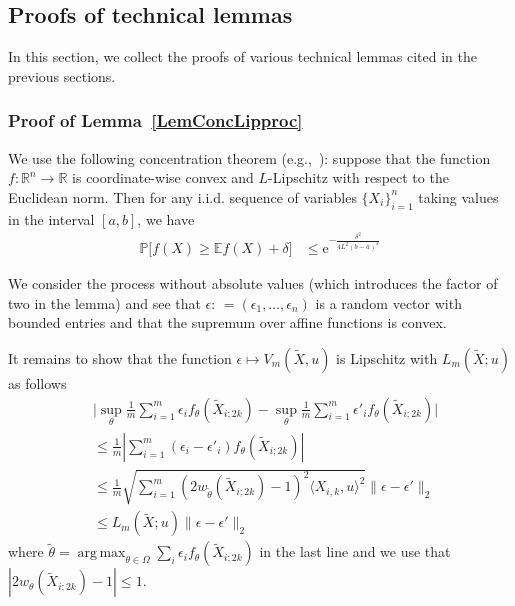 \documentclass[twoside,11pt]{article}
\newcommand{\numobs}{\ensuremath{n}}
\DeclareMathOperator*{\argmax}{arg\, max}
\def\RN{ \mathbb{R} }						%
\def\EE{ \mathbb{E} }
\def\E{ \mathrm{e} }							%
\newcommand{\norm}[1]{\ensuremath{\|#1\|_2}}
\newcommand{\weightsingle}[2]{w_{#1}(#2)}
\newcommand{\paramjoint}{\theta}
\newcommand{\paramspacejoint}{\DomTheta}
\newcommand{\mprob}{\ensuremath{\mathbb{P}}}
\newcommand{\defn}{: \, = }
\newcommand{\DomTheta}{\ensuremath{\Omega}}
\newcommand{\Xtil}{\ensuremath{\widetilde{X}}}
\newcommand{\processradobs}{\ensuremath{V_m}}
\newcommand{\funcproc}{f_{\paramjoint}}
\newcommand{\blockXi}{\Xtil_{i;2k}}
\newcommand{\lipproc}{\ensuremath{L_m}}
\begin{document}

\subsection{Proofs of technical lemmas}
\label{SecNewTechnical}

In this section, we collect the proofs of various technical lemmas
cited in the previous sections.

\subsubsection{Proof of Lemma~\ref{LemConcLipproc}}

We use the following concentration theorem (e.g.,~\cite{Led96}):
suppose that the function $f:\RN^n \to \RN$ is coordinate-wise convex
and $L$-Lipschitz with respect to the Euclidean norm.  Then for any
i.i.d. sequence of variables $\{X_i\}_{i=1}^\numobs$ taking values in
the interval $[a,b]$, we have
\begin{align}
\mprob \big[f(X) \geq \EE f(X) + \delta \big] & \leq
\E^{-\frac{\delta^2}{4L^2(b-a)^2}}
\end{align}

We consider the process without absolute values
(which introduces the factor of two in the lemma) and see that
$\epsilon \defn (\epsilon_1, \dots, \epsilon_{n})$ is a random vector
with bounded entries and that the supremum over affine functions is
convex. 

It remains to show that the function $\epsilon \mapsto
\processradobs(\Xtil,u)$ is Lipschitz with $\lipproc(\Xtil;u)$ as follows
\begin{align*}
&\big| \sup_{\paramjoint} \frac{1}{m}\sum_{i=1}^m \epsilon_i
\funcproc(\blockXi) - \sup_{\paramjoint} \frac{1}{m}\sum_{i=1}^m
\epsilon'_i \funcproc(\blockXi) \big| \\
&\leq \frac{1}{m}|\sum_{i=1}^m
(\epsilon_i -\epsilon'_i)\funcproc(\blockXi)| \\ 
&\leq \frac{1}{m}\sqrt{\sum_{i=1}^m
  (2\weightsingle{\tilde{\paramjoint}}{\blockXi}-1)^2 \langle
  X_{i,k},u\rangle^2} \norm{\epsilon - \epsilon'}\\ &\leq
\lipproc(\Xtil;u) \norm{\epsilon -\epsilon'}
\end{align*}
where $\tilde{\paramjoint} = \argmax_{\paramjoint \in \paramspacejoint} \sum_i
\epsilon_i \funcproc(\blockXi)$ in the last line and we use that
$|2\weightsingle{\paramjoint}{\blockXi}-1| \leq 1$.
\end{document}

